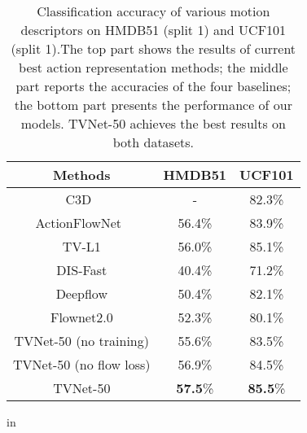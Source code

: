 \documentclass[10pt,twocolumn,letterpaper]{article}
\begin{document}
\begin{table}[t!]
\centering
\caption{Classification accuracy of various motion descriptors on HMDB51 (split 1) and UCF101 (split 1).The top part shows the results of current best action representation methods; the middle part reports the accuracies of the four baselines; the bottom part presents the performance of our models. TVNet-50 achieves the best results on both datasets.}
\label{Tab:action}
\tabcolsep 4pt \renewcommand{\arraystretch}{0.8}
\begin{tabular}{c|c|c}
\toprule
Methods                       & HMDB51         & UCF101                    \\
\hline
C3D~\cite{tran2015learning}                         & -              & 82.3\%                      \\
ActionFlowNet~\cite{ng2016actionflownet}              & 56.4\%         & 83.9\% \\
\hline
TV-L1                         & 56.0\%         & 85.1\%                     \\
DIS-Fast                      & 40.4\%         & 71.2\%                \\
Deepflow                      & 50.4\%         & 82.1\%                    \\
Flownet2.0                    & 52.3\%         & 80.1\%                    \\
\hline
TVNet-50 (no training)        & 55.6\%         & 83.5\%                \\
TVNet-50 (no flow loss)       & 56.9\%         & 84.5\%                    \\
TVNet-50                      & \textbf{57.5}\%& \textbf{85.5}\%                       \\
\bottomrule
\end{tabular}
 in
\end{table}
\end{document}
